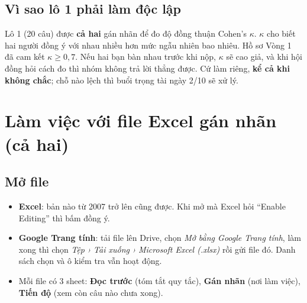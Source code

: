 \documentclass[11pt,a4paper]{article}
\begin{document}
\subsection{Vì sao lô 1 phải làm độc lập}
Lô 1 (20 câu) được \textbf{cả hai} gán nhãn để đo độ đồng thuận Cohen's $\kappa$. $\kappa$ cho biết hai người đồng ý với nhau nhiều hơn mức ngẫu nhiên bao nhiêu. Hồ sơ Vòng 1 đã cam kết $\kappa \ge 0{,}7$. Nếu hai bạn bàn nhau trước khi nộp, $\kappa$ sẽ cao giả, và khi hội đồng hỏi cách đo thì nhóm không trả lời thẳng được. Cứ làm riêng, \textbf{kể cả khi không chắc}; chỗ nào lệch thì buổi trọng tài ngày 2/10 sẽ xử lý.

\section{Làm việc với file Excel gán nhãn (cả hai)}

\subsection{Mở file}
\begin{itemize}
  \item \textbf{Excel}: bản nào từ 2007 trở lên cũng được. Khi mở mà Excel hỏi “Enable Editing” thì bấm đồng ý.
  \item \textbf{Google Trang tính}: tải file lên Drive, chọn \emph{Mở bằng Google Trang tính}, làm xong thì chọn \emph{Tệp › Tải xuống › Microsoft Excel (.xlsx)} rồi gửi file đó. Danh sách chọn và ô kiểm tra vẫn hoạt động.
  \item Mỗi file có 3 sheet: \textbf{Đọc trước} (tóm tắt quy tắc), \textbf{Gán nhãn} (nơi làm việc), \textbf{Tiến độ} (xem còn câu nào chưa xong).
\end{itemize}
\end{document}
